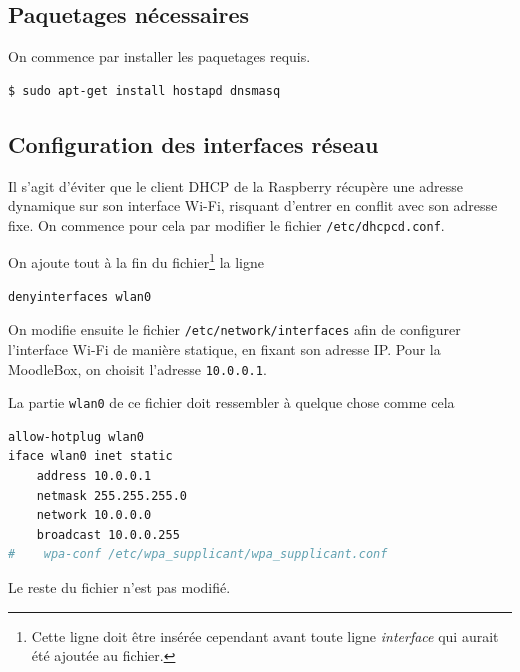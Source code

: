 \documentclass[11pt]{article}
\begin{document}
\subsection{Paquetages nécessaires}

On commence par installer les paquetages requis.
\begin{lstlisting}[language=bash]
$ sudo apt-get install hostapd dnsmasq
\end{lstlisting}

\subsection{Configuration des interfaces réseau}

Il s'agit d'éviter que le client DHCP de la Raspberry récupère une adresse dynamique sur son interface Wi-Fi, risquant d'entrer en conflit avec son adresse fixe. On commence pour cela par modifier le fichier \lstinline{/etc/dhcpcd.conf}.

On ajoute tout à la fin du fichier\footnote{Cette ligne doit être insérée cependant avant toute ligne \emph{interface} qui aurait été ajoutée au fichier.} la ligne
\begin{lstlisting}[language=bash]
denyinterfaces wlan0
\end{lstlisting}

On modifie ensuite le fichier \lstinline{/etc/network/interfaces} afin de configurer l'interface Wi-Fi de manière statique, en fixant son adresse IP. Pour la MoodleBox, on choisit l'adresse \lstinline{10.0.0.1}.

La partie \lstinline{wlan0} de ce fichier doit ressembler à quelque chose comme cela
\begin{lstlisting}[language=bash]
allow-hotplug wlan0
iface wlan0 inet static
    address 10.0.0.1
    netmask 255.255.255.0
    network 10.0.0.0
    broadcast 10.0.0.255
#    wpa-conf /etc/wpa_supplicant/wpa_supplicant.conf
\end{lstlisting}
Le reste du fichier n'est pas modifié.

\end{document}

